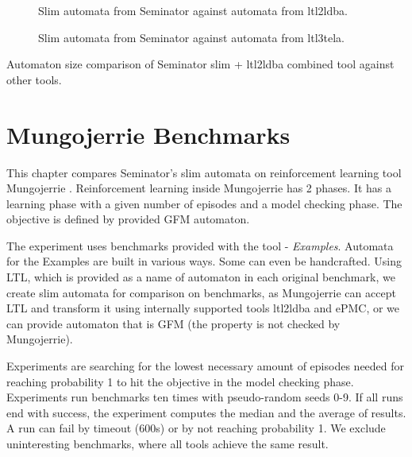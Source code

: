 \documentclass[
	digital,
nolof, nolot
]{fithesis3}
\begin{document}
		\clearpage
		\begin{figure}[ht]
			\centering
			
			\caption{Slim automata from Seminator against automata from ltl2ldba.}
			\label{scatter:seminator-ltl2ldba}
		\begin{tikzpicture}
		
		\end{tikzpicture}
		\end{figure}
	
		\begin{figure}[ht]
			\centering
			
			\caption{Slim automata from Seminator against automata from ltl3tela.}
			\label{scatter:seminator-ltl3tela}
			\begin{tikzpicture}
				
			\end{tikzpicture}
		\end{figure}
	
	\begin{table}[ht]
		\centering
		
		\caption{Automaton size comparison of Seminator slim + ltl2ldba combined tool against other tools.}
		\label{table:basic-tools-mix}
		
	\end{table}

	\chapter{Mungojerrie Benchmarks}
	This chapter compares Seminator's slim automata on reinforcement learning tool Mungojerrie \cite{mungojerrie}. Reinforcement learning inside Mungojerrie has 2 phases. It has a learning phase with a given number of episodes and a model checking phase. The objective is defined by provided GFM automaton.\cite{mungojerrie}
	
	
	The experiment uses benchmarks provided with the tool - \emph{Examples}. Automata for the Examples are built in various ways. Some can even be handcrafted. Using LTL, which is provided as a name of automaton in each original benchmark, we create slim automata for comparison on benchmarks, as Mungojerrie can accept LTL and transform it using internally supported tools ltl2ldba and ePMC, or we can provide automaton that is GFM (the property is not checked by Mungojerrie).
	
	
	Experiments are searching for the lowest necessary amount of episodes needed for reaching probability 1 to hit the objective in the model checking phase. Experiments run benchmarks ten times with pseudo-random seeds 0-9. If all runs end with success, the experiment computes the median and the average of results. A run can fail by timeout (600s) or by not reaching probability 1. We exclude uninteresting benchmarks, where all tools achieve the same result. 
	
\end{document}
